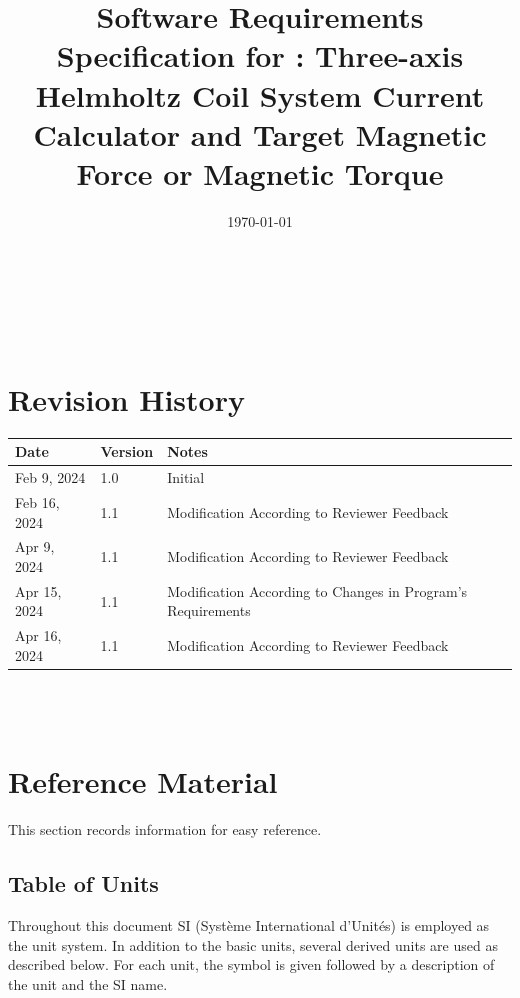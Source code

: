 \documentclass[12pt]{article}
\begin{document}
\title{Software Requirements Specification for \progname: Three-axis Helmholtz Coil System Current Calculator and Target Magnetic Force or Magnetic Torque} 
\author{\authname}
\date{\today}
	
\maketitle

~\newpage


\tableofcontents

~\newpage

\section*{Revision History}

\begin{tabularx}{\textwidth}{p{3cm}p{2cm}X}
\toprule {\bf Date} & {\bf Version} & {\bf Notes}\\
\midrule
Feb 9, 2024 & 1.0 & Initial\\
Feb 16, 2024 & 1.1 & Modification According to Reviewer Feedback\\
Apr 9, 2024 & 1.1 & Modification According to Reviewer Feedback\\
Apr 15, 2024 & 1.1 & Modification According to Changes in Program's Requirements\\
Apr 16, 2024 & 1.1 & Modification According to Reviewer Feedback\\
\bottomrule
\end{tabularx}

~\\

~\newpage

\section{Reference Material}

This section records information for easy reference.

\subsection{Table of Units}

Throughout this document SI (Syst\`{e}me International d'Unit\'{e}s) is employed
as the unit system.  In addition to the basic units, several derived units are
used as described below.  For each unit, the symbol is given followed by a
description of the unit and the SI name.
~\newline
\end{document}
